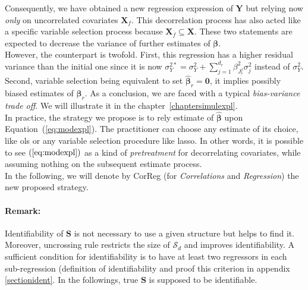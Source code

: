 \documentclass[12pt,a4paper]{report}
\begin{document}
Consequently, we have obtained a new regression expression of $\boldsymbol{Y}$ but relying now {\it only} on uncorrelated covariates $\boldsymbol{X}_f$. This decorrelation process has also acted like a specific variable selection process because $\boldsymbol{X}_f \subseteq \boldsymbol{X}$. These two statements are expected to decrease the variance of further estimates of $\boldsymbol{\beta}$.\\

 However, the counterpart is twofold. First, this regression has a higher residual variance than the initial one since it is now $\sigma^{2*}_Y=\sigma^2_Y+\sum_{j =1}^{d_r}\beta_{J_r^j}^2\sigma^2_j$ instead of $\sigma^2_Y$. Second, variable selection being equivalent to set $\hat{\boldsymbol{\beta}}_r=\boldsymbol{0}$, it implies possibly biased estimates of $\boldsymbol{\beta}_r$. As a conclusion, we are faced with a typical {\it bias-variance trade off}. We will illustrate it in the chapter~\ref{chaptersimulexpl}.\\


In practice, the strategy we propose is to rely estimate of  $\hat{\boldsymbol{\beta}}$ upon Equation~(\ref{eq:modexpl}). The practitioner can choose any estimate of its choice, like {\sc ols} or any variable selection procedure like {\sc lasso}. In other words, it is possible to see $(\ref{eq:modexpl})$ as a kind of {\it pretreatment} for decorrelating covariates, while assuming nothing on the subsequent estimate process.\\

In the following, we will denote by {\sc CorReg} (for {\it Correlations} and {\it Regression}) the new proposed strategy.

\paragraph{Remark:} Identifiability of $\boldsymbol{S}$ is not necessary to use a given structure but helps to find it. Moreover, uncrossing rule restricts the size of $\mathcal{S}_d$ and improves identifiability. A sufficient condition for identifiability is to have at least two regressors in each sub-regression (definition of identifiability and proof this criterion in appendix \ref{sectionident}.
In the followings, true $\boldsymbol{S}$ is supposed to be identifiable.
	

\end{document}

